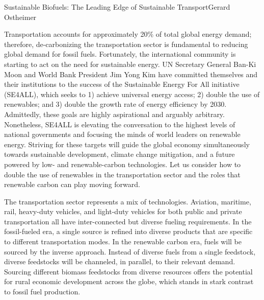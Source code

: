 \documentclass[10pt]{papertex}
\begin{document}
\makeatletter
\renewcommand{\papertex@headDateTime}{
    \raisebox{-5pt}
    {\fontsize{5mm}{6mm}\usefont{T1}{bch}{b}{n}{April 2014}}
    }
\makeatother


\begin{news}{2}{Sustainable Biofuels: The Leading Edge of Sustainable 
    Transport}{Gerard Ostheimer}{}{}

Transportation accounts for approximately 20\% of total global energy demand; 
therefore, de-carbonizing the transportation sector is fundamental to reducing 
global demand for fossil fuels. Fortunately, the international community is 
starting to act on the need for sustainable energy. UN Secretary General 
Ban-Ki Moon and World Bank President Jim Yong Kim have committed themselves 
and their institutions to the success of the Sustainable Energy For All 
initiative (SE4ALL), which seeks to 1) achieve universal energy access; 2) 
double the use of renewables; and 3) double the growth rate of energy 
efficiency by 2030. Admittedly, these goals are highly aspirational and 
arguably arbitrary. Nonetheless, SE4ALL is elevating the conversation to the 
highest levels of national governments and focusing the minds of world leaders 
on renewable energy. Striving for these targets will guide the global economy 
simultaneously towards sustainable development, climate change mitigation, and 
a future powered by low- and renewable-carbon technologies. Let us consider 
how to double the use of renewables in the transportation sector and the roles 
that renewable carbon can play moving forward.


The transportation sector represents a mix of technologies. Aviation, 
maritime, rail, heavy-duty vehicles, and light-duty vehicles for both public 
and private transportation all have inter-connected but diverse fueling 
requirements. In the fossil-fueled era, a single source is refined into 
diverse products that are specific to different transportation modes. In the 
renewable carbon era, fuels will be sourced by the inverse approach. Instead 
of diverse fuels from a single feedstock, diverse feedstocks will be 
channeled, in parallel, to their relevant demand. Sourcing different biomass 
feedstocks from diverse resources offers the potential for rural economic 
development across the globe, which stands in stark contrast to fossil fuel 
production.


\end{news}
\end{document}
